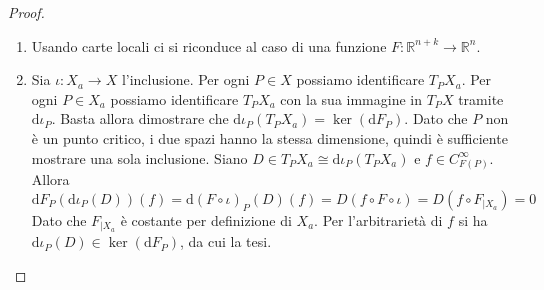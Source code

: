 \documentclass[a4paper,11pt]{article}
\theoremstyle{definition}
\theoremstyle{theorem}
\begin{document}
\begin{proof}
	\begin{enumerate}
		\item Usando carte locali ci si riconduce al caso di una funzione $F\colon\mathbb{R}^{n+k}\to\mathbb{R}^n$.
		\item Sia $\iota\colon X_a\to X$ l'inclusione. Per ogni $P\in X$ possiamo identificare $T_PX_a$. Per ogni $P\in X_a$ possiamo identificare $T_PX_a$ con la sua immagine in $T_PX$ tramite $\mathrm{d}\iota_P$. Basta allora dimostrare che $\mathrm{d}\iota_P(T_PX_a)=\ker(\mathrm{d}F_P)$. Dato che $P$ non è un punto critico, i due spazi hanno la stessa dimensione, quindi è sufficiente mostrare una sola inclusione. Siano $D\in T_PX_a\cong\mathrm{d}\iota_P(T_PX_a)$ e $f\in C^\infty_{F(P)}$. Allora
		\[\mathrm{d}F_P(\mathrm{d}\iota_P(D))(f)=\mathrm{d}(F\circ\iota)_P(D)(f)=D(f\circ F\circ\iota)=D(f\circ F_{|X_a})=0\]
		Dato che $F_{|X_a}$ è costante per definizione di $X_a$. Per l'arbitrarietà di $f$ si ha $\mathrm{d}\iota_P(D)\in\ker(\mathrm{d}F_P)$, da cui la tesi.
	\end{enumerate}
\end{proof}
\newpage
\end{document}
